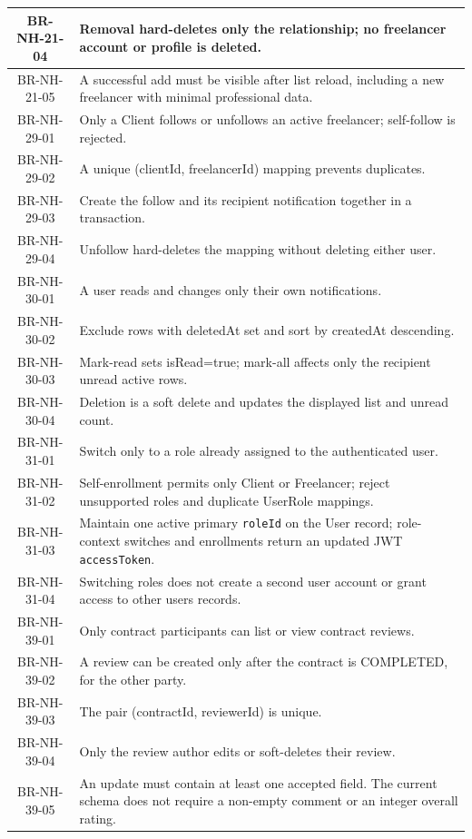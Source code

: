 \begin{longtable}{|c|p{12cm}|}
BR-NH-21-04 & Removal hard-deletes only the relationship; no freelancer account or profile is deleted. \\ \hline
BR-NH-21-05 & A successful add must be visible after list reload, including a new freelancer with minimal professional data. \\ \hline
BR-NH-29-01 & Only a Client follows or unfollows an active freelancer; self-follow is rejected. \\ \hline
BR-NH-29-02 & A unique (clientId, freelancerId) mapping prevents duplicates. \\ \hline
BR-NH-29-03 & Create the follow and its recipient notification together in a transaction. \\ \hline
BR-NH-29-04 & Unfollow hard-deletes the mapping without deleting either user. \\ \hline
BR-NH-30-01 & A user reads and changes only their own notifications. \\ \hline
BR-NH-30-02 & Exclude rows with deletedAt set and sort by createdAt descending. \\ \hline
BR-NH-30-03 & Mark-read sets isRead=true; mark-all affects only the recipient unread active rows. \\ \hline
BR-NH-30-04 & Deletion is a soft delete and updates the displayed list and unread count. \\ \hline
BR-NH-31-01 & Switch only to a role already assigned to the authenticated user. \\ \hline
BR-NH-31-02 & Self-enrollment permits only Client or Freelancer; reject unsupported roles and duplicate UserRole mappings. \\ \hline
BR-NH-31-03 & Maintain one active primary \texttt{roleId} on the User record; role-context switches and enrollments return an updated JWT \texttt{accessToken}. \\ \hline
BR-NH-31-04 & Switching roles does not create a second user account or grant access to other users records. \\ \hline
BR-NH-39-01 & Only contract participants can list or view contract reviews. \\ \hline
BR-NH-39-02 & A review can be created only after the contract is COMPLETED, for the other party. \\ \hline
BR-NH-39-03 & The pair (contractId, reviewerId) is unique. \\ \hline
BR-NH-39-04 & Only the review author edits or soft-deletes their review. \\ \hline
BR-NH-39-05 & An update must contain at least one accepted field. The current schema does not require a non-empty comment or an integer overall rating. \\ \hline

\end{longtable}
